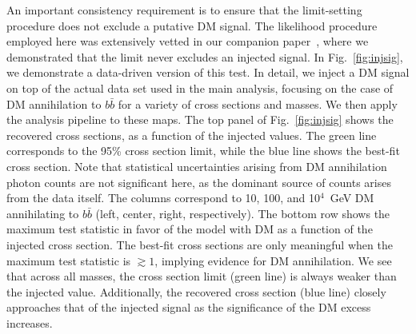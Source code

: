  An important consistency requirement is to ensure that the limit-setting procedure does not exclude a putative DM signal. The likelihood procedure employed here was extensively vetted in our companion paper~\cite{companion}, where we demonstrated that the limit never excludes an injected signal.  In Fig.~\ref{fig:injsig}, we demonstrate a data-driven version of this test. In detail, we inject a DM signal on top of the actual data set used in the main analysis, focusing on the case of DM annihilation to $b \bar{b}$ for a variety of cross sections and masses. We then apply the analysis pipeline to these maps.  The top panel of Fig.~\ref{fig:injsig} shows the recovered cross sections, as a function of the injected values.  The green line corresponds to the 95\% cross section limit, while the blue line shows the best-fit cross section.  Note that statistical uncertainties arising from DM annihilation photon counts are not significant here, as the dominant source of counts arises from the data itself. 
The columns correspond to 10, 100, and 10$^4$~GeV DM annihilating to $b \bar b$ (left, center, right, respectively).  The bottom row shows the maximum test statistic in favor of the model with DM as a function of the injected cross section.  The best-fit cross sections are only meaningful when the maximum test statistic is $\gtrsim 1$, implying evidence for DM annihilation.     
We see that across all masses, the cross section limit  (green line) is always weaker than the injected value.  Additionally, the recovered cross section (blue line) closely approaches that of the injected signal as the significance of the DM excess  increases.   
\vspace{0.1in}

